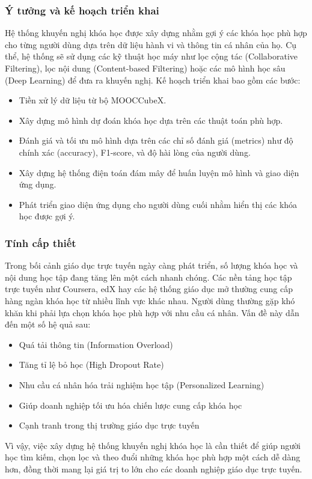 \subsubsection{Ý tưởng và kế hoạch triển khai}
Hệ thống khuyến nghị khóa học được xây dựng nhằm gợi ý các khóa học phù hợp cho từng người dùng dựa trên dữ liệu hành vi và thông tin cá nhân của họ. Cụ thể, hệ thống sẽ sử dụng các kỹ thuật học máy như lọc cộng tác (Collaborative Filtering), lọc nội dung (Content-based Filtering) hoặc các mô hình học sâu (Deep Learning) để đưa ra khuyến nghị. Kế hoạch triển khai bao gồm các bước:
\begin{itemize}
    \item Tiền xử lý dữ liệu từ bộ MOOCCubeX.
    \item Xây dựng mô hình dự đoán khóa học dựa trên các thuật toán phù hợp.
    \item Đánh giá và tối ưu mô hình dựa trên các chỉ số đánh giá (metrics) như độ chính xác (accuracy), F1-score, và độ hài lòng của người dùng.
    \item Xây dựng hệ thống điện toán đám mây để huấn luyện mô hình và giao diện ứng dụng.
    \item Phát triển giao diện ứng dụng cho người dùng cuối nhằm hiển thị các khóa học được gợi ý.
\end{itemize}
\subsubsection{Tính cấp thiết}
Trong bối cảnh giáo dục trực tuyến ngày càng phát triển, số lượng khóa học và nội dung học tập đang tăng lên một cách nhanh chóng. Các nền tảng học tập trực tuyến như Coursera, edX hay các hệ thống giáo dục mở thường cung cấp hàng ngàn khóa học từ nhiều lĩnh vực khác nhau. Người dùng thường gặp khó khăn khi phải lựa chọn khóa học phù hợp với nhu cầu cá nhân. Vấn đề này dẫn đến một số hệ quả sau:
\begin{itemize}
    \item Quá tải thông tin (Information Overload)
    \item Tăng tỉ lệ bỏ học (High Dropout Rate)
    \item Nhu cầu cá nhân hóa trải nghiệm học tập (Personalized Learning)
    \item Giúp doanh nghiệp tối ưu hóa chiến lược cung cấp khóa học
    \item Cạnh tranh trong thị trường giáo dục trực tuyến
\end{itemize}
Vì vậy, việc xây dựng hệ thống khuyến nghị khóa học là cần thiết để giúp người học tìm kiếm, chọn lọc và theo đuổi những khóa học phù hợp một cách dễ dàng hơn, đồng thời mang lại giá trị to lớn cho các doanh nghiệp giáo dục trực tuyến.
